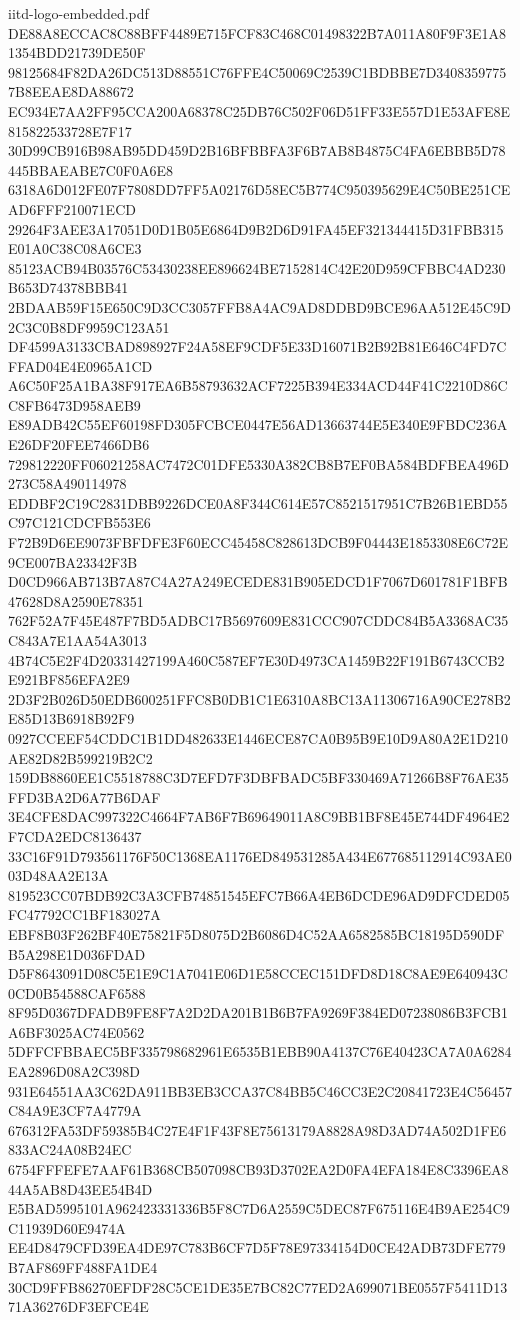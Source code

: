 \begin{filecontents*}[overwrite]{iitd-logo-embedded.pdf}
DE88A8ECCAC8C88BFF4489E715FCF83C468C01498322B7A011A80F9F3E1A81354BDD21739DE50F
98125684F82DA26DC513D88551C76FFE4C50069C2539C1BDBBE7D34083597757B8EEAE8DA88672
EC934E7AA2FF95CCA200A68378C25DB76C502F06D51FF33E557D1E53AFE8E815822533728E7F17
30D99CB916B98AB95DD459D2B16BFBBFA3F6B7AB8B4875C4FA6EBBB5D78445BBAEABE7C0F0A6E8
6318A6D012FE07F7808DD7FF5A02176D58EC5B774C950395629E4C50BE251CEAD6FFF210071ECD
29264F3AEE3A17051D0D1B05E6864D9B2D6D91FA45EF321344415D31FBB315E01A0C38C08A6CE3
85123ACB94B03576C53430238EE896624BE7152814C42E20D959CFBBC4AD230B653D74378BBB41
2BDAAB59F15E650C9D3CC3057FFB8A4AC9AD8DDBD9BCE96AA512E45C9D2C3C0B8DF9959C123A51
DF4599A3133CBAD898927F24A58EF9CDF5E33D16071B2B92B81E646C4FD7CFFAD04E4E0965A1CD
A6C50F25A1BA38F917EA6B58793632ACF7225B394E334ACD44F41C2210D86CC8FB6473D958AEB9
E89ADB42C55EF60198FD305FCBCE0447E56AD13663744E5E340E9FBDC236AE26DF20FEE7466DB6
729812220FF06021258AC7472C01DFE5330A382CB8B7EF0BA584BDFBEA496D273C58A490114978
EDDBF2C19C2831DBB9226DCE0A8F344C614E57C8521517951C7B26B1EBD55C97C121CDCFB553E6
F72B9D6EE9073FBFDFE3F60ECC45458C828613DCB9F04443E1853308E6C72E9CE007BA23342F3B
D0CD966AB713B7A87C4A27A249ECEDE831B905EDCD1F7067D601781F1BFB47628D8A2590E78351
762F52A7F45E487F7BD5ADBC17B5697609E831CCC907CDDC84B5A3368AC35C843A7E1AA54A3013
4B74C5E2F4D20331427199A460C587EF7E30D4973CA1459B22F191B6743CCB2E921BF856EFA2E9
2D3F2B026D50EDB600251FFC8B0DB1C1E6310A8BC13A11306716A90CE278B2E85D13B6918B92F9
0927CCEEF54CDDC1B1DD482633E1446ECE87CA0B95B9E10D9A80A2E1D210AE82D82B599219B2C2
159DB8860EE1C5518788C3D7EFD7F3DBFBADC5BF330469A71266B8F76AE35FFD3BA2D6A77B6DAF
3E4CFE8DAC997322C4664F7AB6F7B69649011A8C9BB1BF8E45E744DF4964E2F7CDA2EDC8136437
33C16F91D793561176F50C1368EA1176ED849531285A434E677685112914C93AE003D48AA2E13A
819523CC07BDB92C3A3CFB74851545EFC7B66A4EB6DCDE96AD9DFCDED05FC47792CC1BF183027A
EBF8B03F262BF40E75821F5D8075D2B6086D4C52AA6582585BC18195D590DFB5A298E1D036FDAD
D5F8643091D08C5E1E9C1A7041E06D1E58CCEC151DFD8D18C8AE9E640943C0CD0B54588CAF6588
8F95D0367DFADB9FE8F7A2D2DA201B1B6B7FA9269F384ED07238086B3FCB1A6BF3025AC74E0562
5DFFCFBBAEC5BF335798682961E6535B1EBB90A4137C76E40423CA7A0A6284EA2896D08A2C398D
931E64551AA3C62DA911BB3EB3CCA37C84BB5C46CC3E2C20841723E4C56457C84A9E3CF7A4779A
676312FA53DF59385B4C27E4F1F43F8E75613179A8828A98D3AD74A502D1FE6833AC24A08B24EC
6754FFFEFE7AAF61B368CB507098CB93D3702EA2D0FA4EFA184E8C3396EA844A5AB8D43EE54B4D
E5BAD5995101A962423331336B5F8C7D6A2559C5DEC87F675116E4B9AE254C9C11939D60E9474A
EE4D8479CFD39EA4DE97C783B6CF7D5F78E97334154D0CE42ADB73DFE779B7AF869FF488FA1DE4
30CD9FFB86270EFDF28C5CE1DE35E7BC82C77ED2A699071BE0557F5411D1371A36276DF3EFCE4E

\end{filecontents*}
